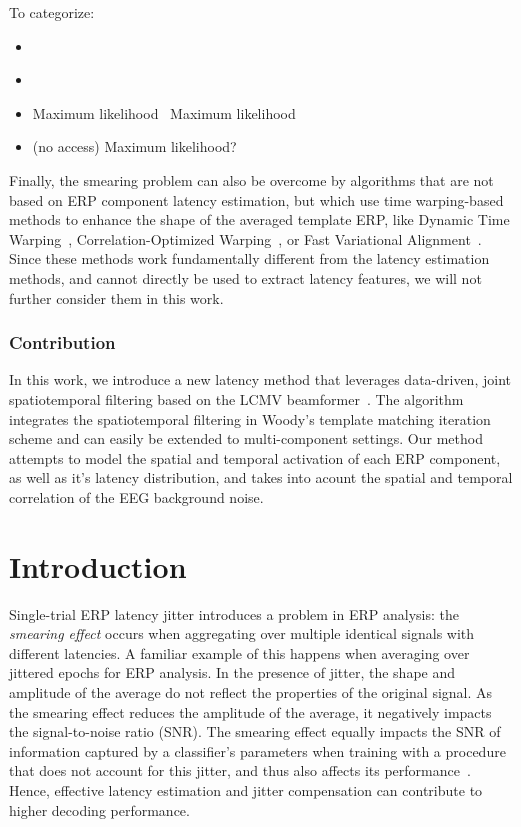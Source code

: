 To categorize:
\begin{itemize}
	\item \cite{Dimitriadis2018}
	\item \cite{Thornton2008}
	\item Maximum likelihood~\cite{tuan1987variable, Moecks1988,Puce1994} Maximum likelihood
	\item \cite{Gratton1989} (no access) Maximum likelihood?
\end{itemize}


Finally, the smearing problem can also be overcome by algorithms that are not
based on ERP component latency estimation, but which use time warping-based methods
to enhance the shape of the averaged template ERP, like Dynamic Time
Warping~\cite{486255, wang2001warp, Zoumpoulaki2015}, Correlation-Optimized
Warping~\cite{Skov2006}, or Fast Variational
Alignment~\cite{flotho2021fast}. Since these methods work
fundamentally different from the latency estimation methods, and cannot
directly be used to extract latency features, we will not further consider them
in this work.

\subsubsection{Contribution}
In this work, we introduce a new latency method that leverages data-driven,
joint spatiotemporal filtering based on the LCMV beamformer~\cite{Vliet2016}. The algorithm
integrates the spatiotemporal filtering in Woody's template matching iteration
scheme and can easily be extended to multi-component settings.
Our method attempts to model the spatial and temporal activation of
each ERP component, as well as it's latency distribution, and takes into acount the
spatial and temporal correlation of the EEG background noise.


\section{Introduction}
Single-trial ERP latency jitter introduces a problem in ERP analysis:
the \textit{smearing effect} occurs when aggregating over multiple identical
signals with different latencies.
A familiar example of this happens when averaging over jittered epochs for ERP
analysis.
In the presence of jitter, the shape and amplitude of the average do not
reflect the properties of the original signal.
As the smearing effect reduces the amplitude of the average,
it negatively impacts the signal-to-noise ratio (SNR).
The smearing effect equally impacts the SNR of information captured by a
classifier's parameters when training with a procedure that does not account for
this jitter, and thus also affects its performance~\cite{Thompson2012}.
Hence, effective latency estimation and jitter compensation can contribute to higher
decoding performance.

